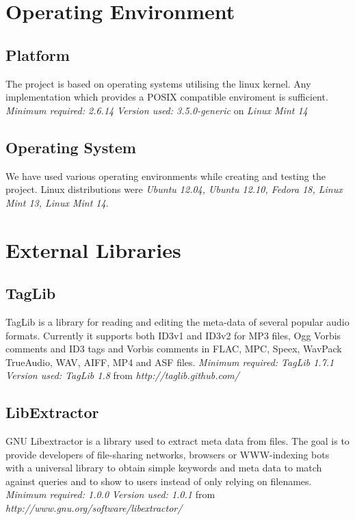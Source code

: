 \section {Operating Environment}
\subsection {Platform}
The project is based on operating systems utilising the linux kernel. Any implementation which provides a POSIX compatible enviroment is sufficient. \newline
\emph{Minimum required: 2.6.14} \newline
\emph{Version used: 3.5.0-generic} on \emph{Linux Mint 14}

\subsection {Operating System}
We have used various operating environments while creating and testing the project. Linux distributions were \emph{Ubuntu 12.04, Ubuntu 12.10, Fedora 18, Linux Mint 13, Linux Mint 14}.

\section {External Libraries}
\subsection{TagLib}
TagLib is a library for reading and editing the meta-data of several popular audio formats. Currently it supports both ID3v1 and ID3v2 for MP3 files, Ogg Vorbis comments and ID3 tags and Vorbis comments in FLAC, MPC, Speex, WavPack TrueAudio, WAV, AIFF, MP4 and ASF files. \newline
\emph{Minimum required: TagLib 1.7.1} \newline
\emph{Version used: TagLib 1.8} from \emph{http://taglib.github.com/}

\subsection{LibExtractor}
GNU Libextractor is a library used to extract meta data from files. The goal is to provide developers of file-sharing networks, browsers or WWW-indexing bots with a universal library to obtain simple keywords and meta data to match against queries and to show to users instead of only relying on filenames.  \newline
\emph{Minimum required: 1.0.0} \newline
\emph{Version used: 1.0.1} from \emph{http://www.gnu.org/software/libextractor/}

